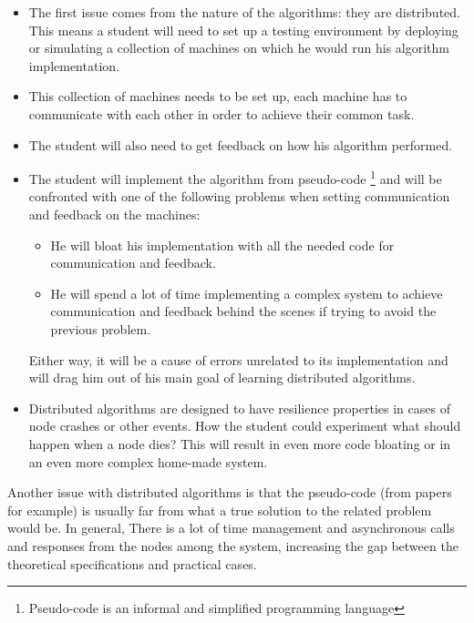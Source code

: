 \documentclass{eplmastersthesis}
\begin{document}
      \begin{itemize}
        \item The first issue comes from the nature of the algorithms: they are
        distributed. This means a student will need to set up a testing
        environment by deploying or simulating a collection of machines on
        which he would run his algorithm implementation.
        \item This collection of machines needs to be set up, each machine has
        to communicate with each other in order to achieve their common task.
        \item The student will also need to get feedback on how his
        algorithm performed.
        \item The student will implement the algorithm from pseudo-code
        \footnote{Pseudo-code is an informal and simplified programming language}
        and will be confronted with one of the following problems when setting
        communication and feedback on the machines:
          \begin{itemize}
            \item He will bloat his implementation with all the needed
            code for communication and feedback.
            \item He will spend a lot of time implementing a complex
            system to achieve communication and feedback behind the scenes if
            trying to avoid the previous problem.
          \end{itemize}
        Either way, it will be a cause of errors unrelated to its
        implementation and will drag him out of his main goal of learning
        distributed algorithms.
        \item Distributed algorithms are designed to have resilience
        properties in cases of node crashes or other events. How the student
        could experiment what should happen when a node dies? This will result
        in even more code bloating or in an even more complex home-made system.
      \end{itemize}

      Another issue with distributed algorithms is that the pseudo-code
      (from papers for example) is usually far from what a true solution to the
      related problem would be. In general, There is a lot of time management
      and asynchronous calls and responses from the nodes among the system,
      increasing the gap between the theoretical specifications and practical
      cases.
\end{document}

